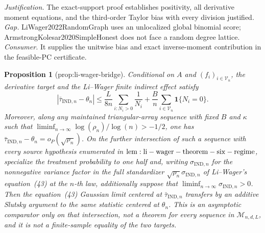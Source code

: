\documentclass{article}
\newtheorem{proposition}{Proposition}
\begin{document}
\par\smallskip\noindent \textit{Justification.} The exact-support proof establishes positivity, all derivative moment equations, and the third-order Taylor bias with every division justified. \textit{Gap.} LiWager2022RandomGraph uses an unlocalized global binomial score; ArmstrongKolesar2020SimpleHonest does not face a random degree lattice. \textit{Consumer.} It supplies the unitwise bias and exact inverse-moment contribution in the feasible-PC certificate.

\begin{proposition}[prop:li-wager-bridge]\label{prop:li-wager-bridge}
Conditional on \(A\) and \((f_i)_{i\in\mathcal V_n}\), the derivative target and the Li--Wager finite indirect effect satisfy
\[
 \left|\bar\tau_{\mathrm{IND},n}-\theta_n\right|
 \le \frac{L}{8n}\sum_{i:N_i>0}\frac{1}{N_i}
 +\frac{B}{n}\sum_{i\in\mathcal V_n}\mathbf 1\{N_i=0\}.
\]
Moreover, along any maintained triangular-array sequence with fixed \(B\) and \(\kappa\) such that \(\liminf_{n\to\infty}\log(\rho_n)/\log(n)>-1/2\), one has \(\bar\tau_{\mathrm{IND},n}-\theta_n=o_P(\sqrt{\rho_n})\). On the further intersection of such a sequence with every source hypothesis enumerated in \({\rm lem:li-wager-theorem-six-regime}\), specialize the treatment probability to one half and, writing \(\sigma_{\mathrm{IND},n}\) for the nonnegative variance factor in the full standardizer \(\sqrt{\rho_n}\sigma_{\mathrm{IND},n}\) of Li--Wager's equation~(43) at the \(n\)-th law, additionally suppose that \(\liminf_{n\to\infty}\sigma_{\mathrm{IND},n}>0\). Then the equation~(43) Gaussian limit centered at \(\bar\tau_{\mathrm{IND},n}\) transfers by an additive Slutsky argument to the same statistic centered at \(\theta_n\). This is an asymptotic comparator only on that intersection, not a theorem for every sequence in \(\mathcal M_{n,d,L}\), and it is not a finite-sample equality of the two targets.
\end{proposition}
\end{document}
